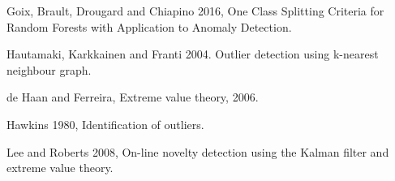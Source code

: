 \documentclass[9pt]{beamer}
\begin{document}
\begin{frame}
\begin{itemize}
{\item Goix, Brault, Drougard and Chiapino 2016, One Class Splitting Criteria for Random Forests with Application to Anomaly Detection.

\item Hautamaki, Karkkainen and Franti 2004. Outlier detection using k-nearest neighbour graph.

\item de Haan and Ferreira, Extreme value theory, 2006.

\item Hawkins 1980, Identification of outliers.

\item Lee and Roberts 2008, On-line novelty detection using the Kalman filter and extreme value theory.

}
\end{itemize}
\end{frame}
\end{document}

